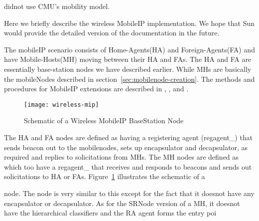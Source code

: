 { didnot use CMU's mobility model.

Here we briefly describe the wireless MobileIP implementation. We hope that Sun would provide the detailed version of the documentation in the future.

The mobileIP scenario consists of Home-Agents(HA) and Foreign-Agents(FA) and have Mobile-Hosts(MH) moving between their HA and FAs.
The HA and FA are essentially base-station nodes we have described earlier. While MHs are basically the mobileNodes described in section~\ref{sec:mobilenode-creation}.
The methods and procedures for MobileIP extensions are described in , ,  and .

\begin{figure}
    \centerline{\texttt{[image: wireless-mip]}}
    \caption{Schematic of a Wireless MobileIP BaseStation Node}
    \label{fig:mobilenode-wireless-mip}
\end{figure}
The HA and FA nodes are defined as  having a registering agent (regagent\_) that sends beacon out to the mobilenodes, sets up encapsulator and decapsulator, as required and replies to solicitations from MHs. 
The MH nodes are defined as  which too have a regagent\_ that receives and responds to beacons and sends out solicitations to HA or FAs. Figure~\ref{fig:mobilenode-wireless-mip} illustrates the schematic of a 






















 node. The  node is very similar to this except for the fact that it doesnot have any encapsulator or decapsulator. As for the SRNode version of a MH, it doesnot have the hierarchical classifiers and the RA agent forms the entry poi






















}
